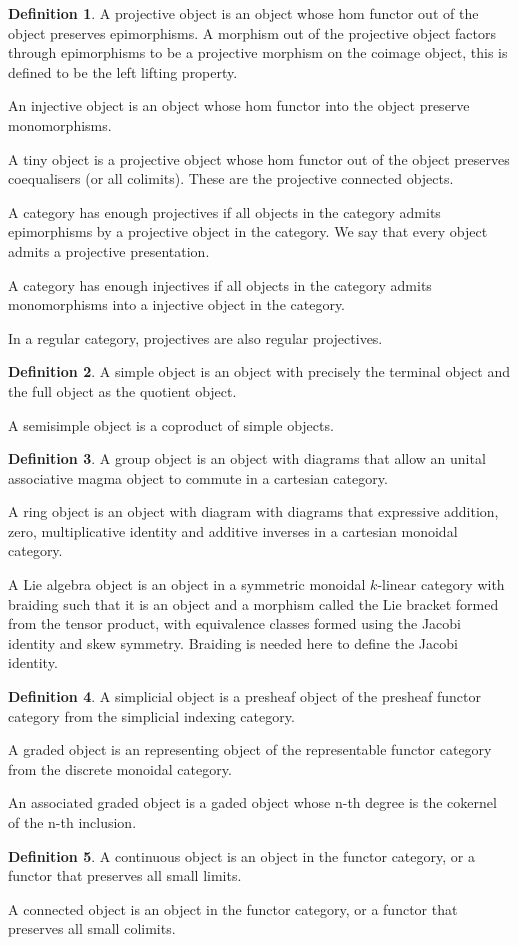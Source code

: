 \documentclass[10pt]{article}
\theoremstyle{plain}%
\theoremstyle{definition}
\newtheorem{definition}{Definition}[section]
\theoremstyle{remark}
\begin{document}
\begin{definition}
    A projective object is an object whose hom functor out of the object preserves epimorphisms. A morphism out of the projective object factors through epimorphisms to be a projective morphism on the coimage object, this is defined to be the left lifting property.
    
    An injective object is an object whose hom functor into the object preserve monomorphisms.

    A tiny object is a projective object whose hom functor out of the object preserves coequalisers (or all colimits). These are the projective connected objects.

    A category has enough projectives if all objects in the category admits epimorphisms by a projective object in the category. We say that every object admits a projective presentation.

    A category has enough injectives if all objects in the category admits monomorphisms into a injective object in the category.

    In a regular category, projectives are also regular projectives.
\end{definition}

\begin{definition}
    A simple object is an object with precisely the terminal object and the full object as the quotient object.

    A semisimple object is a coproduct of simple objects.
\end{definition}

\begin{definition}
    A group object is an object with diagrams that allow an unital associative magma object to commute in a cartesian category.

    A ring object is an object with diagram with diagrams that expressive addition, zero, multiplicative identity and additive inverses in a cartesian monoidal category.

    A Lie algebra object is an object in a symmetric monoidal $k$-linear category with braiding such that it is an object and a morphism called the Lie bracket formed from the tensor product, with equivalence classes formed using the Jacobi identity and skew symmetry. Braiding is needed here to define the Jacobi identity.
\end{definition}

\begin{definition}
    A simplicial object is a presheaf object of the presheaf functor category from the simplicial indexing category.

    A graded object is an representing object of the representable functor category from the discrete monoidal category.

    An associated graded object is a gaded object whose n-th degree is the cokernel of the n-th inclusion.
\end{definition}

\begin{definition}
    A continuous object is an object in the functor category, or a functor that preserves all small limits.

    A connected object is an object in the functor category, or a functor that preserves all small colimits.
\end{definition}
\end{document}
